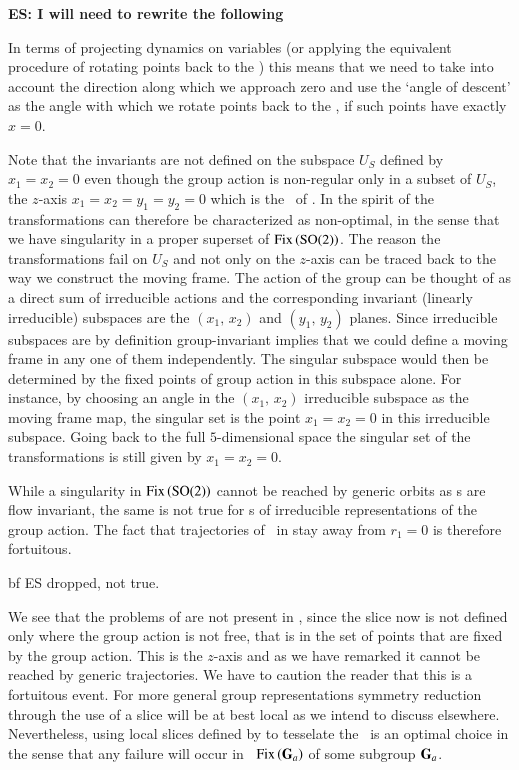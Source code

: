 {\bf ES: I will need to rewrite the following}

In terms of projecting dynamics
on variables  (or applying the equivalent
procedure of rotating points back to the \slice) this means that
we need to take into account the direction along which
we approach zero and use the `angle
of descent' as the angle with which we rotate points back to the \slice, if such
points have exactly $x=0$.

Note that the invariants are not defined on
the subspace $U_S$ defined by $x_1=x_2=0$ even though the
group action is non-regular only in a subset of $U_S$, the
$z$-axis $x_1=x_2=y_1=y_2=0$ which is the \fixedsp\ of .
In the spirit of  the transformations 
can therefore be characterized as non-optimal, in the sense
that we have singularity in a proper superset of $\mathrm{Fix}\left(\textrm{SO}(2)\right)$.
The reason the transformations fail on $U_S$ and not only on the $z$-axis
can be traced back to the way we construct the moving frame. The action
of the group can be thought of as a direct sum of irreducible
actions and the corresponding invariant (linearly irreducible)
subspaces are the $(x_1,\,x_2)$ and $(y_1,\,y_2)$
planes.
Since irreducible subspaces are by definition group-invariant
implies that we could define a moving frame in any one of them
independently. The singular subspace would then be determined
by the fixed points of group action in this subspace alone.
For instance, by choosing an angle in the $(x_1,\,x_2)$ irreducible subspace
as the moving frame map, the singular set is the point
$x_1=x_2=0$ in this irreducible subspace. Going back to the full
$5$-dimensional space the singular set of the transformations
is still given by $x_1=x_2=0$.

While a singularity in $\mathrm{Fix}\left(\textrm{SO}(2)\right)$ cannot be reached by generic orbits
as {\fixedsp s} are flow invariant, the same is not true for {\fixedsp s}
of irreducible representations of the group action.
The fact that trajectories of \cLf\ in  stay away from $r_1=0$ is therefore
fortuitous.

{bf ES dropped, not true.}

We see that the problems of
 are not present in , since
the slice now is not defined only where the group action is not free,
that is in the set of points that are fixed by the group action. This
is the $z$-axis and as we have remarked it cannot be reached by generic
trajectories. We have to caution the reader that this is a fortuitous
event. For more general group representations symmetry reduction through
the use of a slice will be at best local as we intend to discuss
elsewhere. Nevertheless, using local slices defined by 
to tesselate the \reducedsp\ is an optimal choice in the sense that any
failure will occur in \fixedsp\ $\mathrm{Fix}\left(\mathbf{G}_a\right)$ of some subgroup
$\mathbf{G}_a$.




